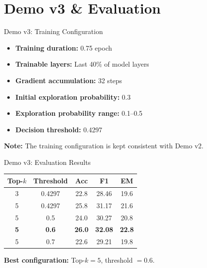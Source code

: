 \section{Demo v3 \& Evaluation}

\begin{frame}{Demo v3: Training Configuration}

\small

\begin{itemize}
    \item \textbf{Training duration:} 0.75 epoch
    \item \textbf{Trainable layers:} Last 40\% of model layers
    \item \textbf{Gradient accumulation:} 32 steps
    \item \textbf{Initial exploration probability:} 0.3
    \item \textbf{Exploration probability range:} 0.1--0.5
    \item \textbf{Decision threshold:} 0.4297
\end{itemize}

\vspace{0.2cm}

\textbf{Note:} The training configuration is kept consistent
with Demo v2.

\end{frame}


\begin{frame}{Demo v3: Evaluation Results}

\centering
\small

\begin{tabular}{ccccc}
    \hline
    \textbf{Top-$k$} & \textbf{Threshold} &
    \textbf{Acc} & \textbf{F1} & \textbf{EM} \\
    \hline
    3 & 0.4297 & 22.8 & 28.46 & 19.6 \\
    5 & 0.4297 & 25.8 & 31.17 & 21.6 \\
    5 & 0.5    & 24.0 & 30.27 & 20.8 \\
    \textbf{5} & \textbf{0.6} &
    \textbf{26.0} & \textbf{32.08} & \textbf{22.8} \\
    5 & 0.7    & 22.6 & 29.21 & 19.8 \\
    \hline
\end{tabular}

\vspace{0.3cm}

\textbf{Best configuration:} Top-$k=5$, threshold $=0.6$.

\end{frame}

